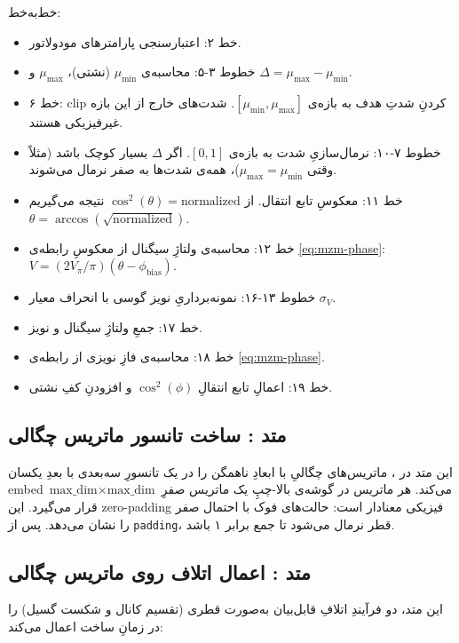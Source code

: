 خط‌به‌خط:
\begin{itemize}
	\item خط ۲: اعتبارسنجی پارامترهای مودولاتور.
	\item خطوط ۳-۵: محاسبه‌ی $\mu_{\min}$ (نشتی)، $\mu_{\max}$ و $\Delta = \mu_{\max} - \mu_{\min}$.
	\item خط ۶: clip کردنِ شدتِ هدف به بازه‌ی $[\mu_{\min}, \mu_{\max}]$. شدت‌های خارج از این بازه غیرفیزیکی هستند.
	\item خطوط ۷-۱۰: نرمال‌سازیِ شدت به بازه‌ی $[0, 1]$. اگر $\Delta$ بسیار کوچک باشد (مثلاً وقتی $\mu_{\max} = \mu_{\min}$)، همه‌ی شدت‌ها به صفر نرمال می‌شوند.
	\item خط ۱۱: معکوسِ تابع انتقال. از $\cos^2(\theta) = \text{normalized}$ نتیجه می‌گیریم $\theta = \arccos(\sqrt{\text{normalized}})$.
	\item خط ۱۲: محاسبه‌ی ولتاژِ سیگنال از معکوسِ رابطه‌ی \eqref{eq:mzm-phase}: $V = (2 V_\pi / \pi)(\theta - \phi_{\text{bias}})$.
	\item خطوط ۱۳-۱۶: نمونه‌برداریِ نویز گوسی با انحراف معیار $\sigma_V$.
	\item خط ۱۷: جمعِ ولتاژِ سیگنال و نویز.
	\item خط ۱۸: محاسبه‌ی فازِ نویزی از رابطه‌ی \eqref{eq:mzm-phase}.
	\item خط ۱۹: اعمالِ تابع انتقالِ $\cos^2(\phi)$ و افزودنِ کفِ نشتی.
\end{itemize}

\subsection{متد : ساخت تانسور ماتریس چگالی}

این متد در ، ماتریس‌های چگالیِ با ابعادِ ناهمگن را در یک تانسورِ سه‌بعدی با بعدِ یکسان embed می‌کند. هر ماتریس در گوشه‌ی بالا-چپِ یک ماتریس صفرِ $\text{max\_dim} \times \text{max\_dim}$ قرار می‌گیرد. این zero-padding فیزیکی معنادار است: حالت‌های فوک با احتمال صفر را نشان می‌دهد. پس از \texttt{padding}، قطر نرمال می‌شود تا جمع برابر ۱ باشد.

\subsection{متد : اعمال اتلاف روی ماتریس چگالی}

این متد، دو فرآیندِ اتلافِ قابل‌بیان به‌صورت قطری (تقسیم کانال و شکست گسیل) را در زمانِ ساخت اعمال می‌کند:

